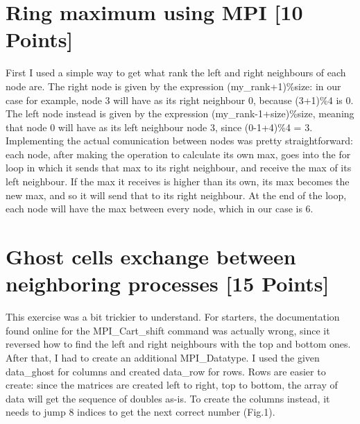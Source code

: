 \documentclass[unicode,11pt,a4paper,oneside,numbers=endperiod,openany]{scrartcl}
\begin{document}
\setassignment
{}

\newline


\section{Ring maximum using MPI [10 Points]}

First I used a simple way to get what rank the left and right neighbours of each node are.
\newline
The right node is given by the expression (my\_rank+1)\%size: in our case for example, node 3 will have as its right neighbour 0, because (3+1)\%4 is 0.
\newline
The left node instead is given by the expression (my\_rank-1+size)\%size, meaning that node 0 will have as its left neighbour node 3, since (0-1+4)\%4 = 3.
\newline
Implementing the actual comunication between nodes was pretty straightforward: each node, after making the operation to calculate its own max,  goes into the for loop in which it sends that max to its right neighbour, and receive the max of its left neighbour. If the max it receives is higher than its own, its max becomes the new max, and so it will send that to its right neighbour. At the end of the loop, each node will have the max between every node, which in our case is 6.

\section{Ghost cells exchange between neighboring processes [15 Points]}

This exercise was a bit trickier to understand. 
\newline
For starters, the documentation found online for the MPI\_Cart\_shift command was actually wrong, since it reversed how to find the left and right neighbours with the top and bottom ones.
\newline
After that, I had to create an additional MPI\_Datatype. I used the given data\_ghost for columns and created data\_row for rows.
\newline
Rows are easier to create: since the matrices are created left to right, top to bottom, the array of data will get the sequence of doubles as-is.
\newline
To create the columns instead,  it needs to jump 8 indices to get the next correct number (Fig.1).
\end{document}
